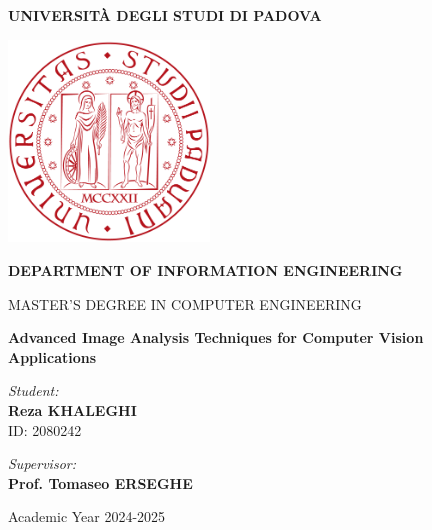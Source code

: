 \begin{titlepage}
    \begin{center}
        \vspace*{0.5cm}
            
        \Huge
        \textbf{UNIVERSITÀ DEGLI STUDI DI PADOVA}
            
        \vspace{1cm}
        
        \includegraphics[width=0.4\textwidth]{figures/unipd_logo.png}
            
        \vspace{1cm}
            
        {\Large\textbf{DEPARTMENT OF INFORMATION ENGINEERING}}
            
        \vspace{0.5cm}
            
        {\Large MASTER'S DEGREE IN COMPUTER ENGINEERING}
            
        \vspace{1cm}
            
        {\Huge\bfseries Advanced Image Analysis Techniques for Computer Vision Applications}
            
        \vspace{1.5cm}
            
        \begin{minipage}{0.45\textwidth}
            \begin{flushleft} \large
                \emph{Student:} \\
                \textbf{Reza KHALEGHI}\\
                ID: 2080242
            \end{flushleft}
        \end{minipage}
        \begin{minipage}{0.45\textwidth}
            \begin{flushright} \large
                \emph{Supervisor:} \\
                \textbf{Prof. Tomaseo ERSEGHE}
            \end{flushright}
        \end{minipage}      
        {\large Academic Year 2024-2025}       
    \end{center}
\end{titlepage}
